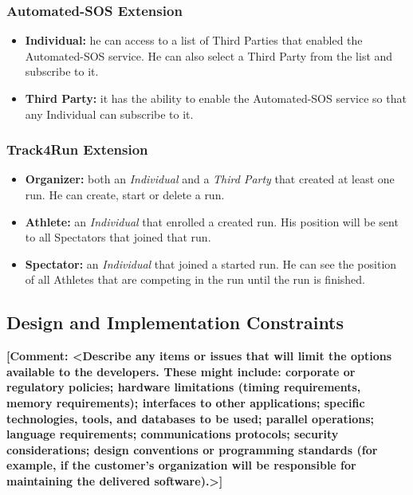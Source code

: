 \documentclass[a4paper]{article}
\newcommand{\comment}[1]{\textbf{[Comment: #1]}}
\begin{document}
        \subsubsection{Automated-SOS Extension}
        \begin{itemize}
            \item \textbf{Individual:} he can access to a list of Third Parties that enabled the Automated-SOS service. He can also select a Third Party from the list and subscribe to it.
            \item \textbf{Third Party:} it has the ability to enable the Automated-SOS service so that any Individual can subscribe to it.
        \end{itemize}
        
        \subsubsection{Track4Run Extension}
        \begin{itemize}
            \item \textbf{Organizer:} both an \textit{Individual} and a \textit{Third Party} that created at least one run. He can create, start or delete a run.
            \item \textbf{Athlete:} an \textit{Individual} that enrolled a created run. His position will be sent to all Spectators that joined that run.
            \item \textbf{Spectator:} an \textit{Individual} that joined a started run. He can see the position of all Athletes that are competing in the run until the run is finished.
        \end{itemize}
        
    \subsection{Design and Implementation Constraints}
    \comment{<Describe any items or issues that will limit the options available to the developers. These might include: corporate or regulatory policies; hardware limitations (timing requirements, memory requirements); interfaces to other applications; specific technologies, tools, and databases to be used; parallel operations; language requirements; communications protocols; security considerations; design conventions or programming standards (for example, if the customer’s organization will be responsible for maintaining the delivered software).>}
    
\end{document}
